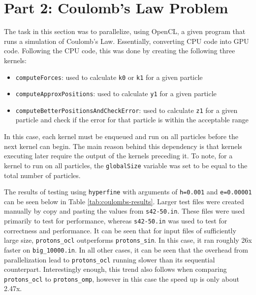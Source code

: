 \documentclass[12pt,reqno]{article}
\begin{document}
\section*{Part 2: Coulomb's Law Problem}
The task in this section was to parallelize, using OpenCL, a given program that runs a simulation of Coulomb's Law. Essentially, converting CPU code into GPU code. Following the CPU code, this was done by creating the following three kernels: 
\begin{itemize}
    \item \texttt{computeForces}: used to calculate \texttt{k0} or \texttt{k1} for a given particle
    \item \texttt{computeApproxPositions}: used to calculate \texttt{y1} for a given particle
    \item \texttt{computeBetterPositionsAndCheckError}: used to calculate \texttt{z1} for a given particle and check if the error for that particle is within the acceptable range
\end{itemize}

In this case, each kernel must be enqueued and run on all particles before the next kernel can begin. The main reason behind this dependency is that kernels executing later require the output of the kernels preceding it. To note, for a kernel to run on all particles, the \texttt{globalSize} variable was set to be equal to the total number of particles.

The results of testing using \texttt{hyperfine} with arguments of \texttt{h=0.001} and \texttt{e=0.00001} can be seen below in Table \ref{tab:coulombs-results}. Larger test files were created manually by copy and pasting the values from \texttt{s42-50.in}. These files were used primarily to test for performance, whereas \texttt{s42-50.in} was used to test for correctness and performance. It can be seen that for input files of sufficiently large size, \texttt{protons\_ocl} outperforms \texttt{protons\_sin}. In this case, it ran roughly 26x faster on \texttt{big\_10000.in}. In all other cases, it can be seen that the overhead from parallelization lead to \texttt{protons\_ocl} running slower than its sequential counterpart. Interestingly enough, this trend also follows when comparing \texttt{protons\_ocl} to \texttt{protons\_omp}, however in this case the speed up is only about 2.47x.
\end{document}
